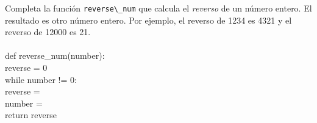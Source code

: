 \documentclass[10pt]{examdesign}
\newcommand{\tab}{\hspace*{2em}}
\begin{document}
\begin{fillin}
\begin{question}[0.5 pt]
Completa la función \lstinline{reverse\_num} que calcula el \emph{reverso}
de un número entero. El resultado es otro número entero. Por ejemplo, el reverso de 1234
es 4321 y el reverso de 12000 es 21. \\
~\\
{\sffamily
def reverse\_num(number): \\
   \tab  reverse = 0\\
   \tab while number != 0:\\
   \tab\tab     reverse = \\
   \tab\tab     number = \\
   \tab  return reverse \\
}


\end{question}


\end{fillin}
\end{document}
